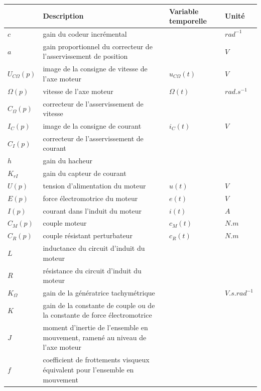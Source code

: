 \clearpage

\begin{tabular}{|p{2cm}|p{7cm}|p{2cm}|p{2cm}|}
\hline
 & \textbf{Description} & \textbf{Variable temporelle} & \textbf{Unité} \\ \hline
$c$ & gain du codeur incrémental & & $rad^{-1}$ \\ \hline
$a$ & gain proportionnel du correcteur de l'asservissement de position & & $V$ \\ \hline
$U_{C\Omega}(p)$ & image de la consigne de vitesse de l'axe moteur & $u_{C\Omega}(t)$ & $V$ \\ \hline
$\Omega(p)$ & vitesse de l'axe moteur & $\Omega(t)$ & $rad.s^{-1}$ \\ \hline
$C_{\Omega}(p)$ & correcteur de l'asservissement de vitesse	& &  \\ \hline
$I_C(p)$ & image de la consigne de courant & $i_C(t)$	& $V$ \\ \hline
$C_I(p)$ & correcteur de l'asservissement de courant & & \\ \hline
$h$ & gain du hacheur & & \\ \hline
$K_{rI}$ & gain du capteur de courant & &  \\ \hline
$U(p)$ & tension d'alimentation du moteur & $u(t)$ & $V$ \\ \hline
$E(p)$ & force électromotrice du moteur	& $e(t)$ & $V$ \\ \hline
$I(p)$ & courant dans l'induit  du moteur & $i(t)$ & $A$ \\ \hline
$C_M(p)$ & couple moteur & $c_M(t)$ & $N.m$ \\ \hline
$C_R(p)$ & couple résistant perturbateur & $c_R(t)$ & $N.m$ \\ \hline
$L$ & inductance du circuit d'induit du moteur & & \\ \hline
$R$ & résistance du circuit d'induit du moteur & & \\ \hline
$K_{\Omega}$ & gain de la génératrice tachymétrique	& & $V.s.rad^{-1}$ \\ \hline
$K$ & gain de la constante de couple ou de la constante de force électromotrice	& &  \\ \hline
$J$ & moment d'inertie  de l'ensemble  en mouvement, ramené  au  niveau  de l'axe moteur & &  \\ \hline
$f$ & coefficient de frottements visqueux équivalent pour l'ensemble en mouvement & &  \\ \hline
\end{tabular}

